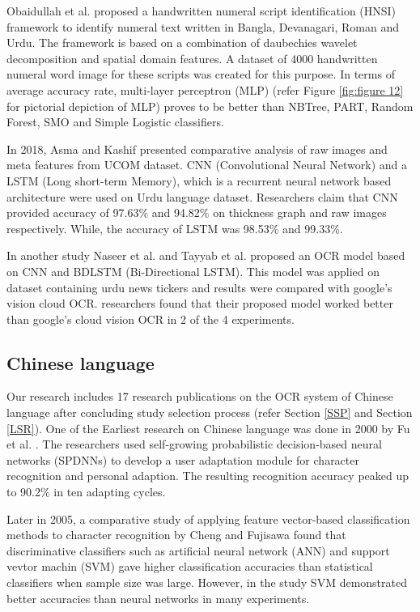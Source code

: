 \documentclass{article}
\begin{document}
Obaidullah et al. \cite{obaidullah2015numeral} proposed a handwritten numeral script identification (HNSI) framework to identify numeral text written in Bangla, Devanagari, Roman and Urdu. The framework is based on a combination of daubechies wavelet decomposition \cite{Daub} and spatial domain features. A dataset of 4000 handwritten numeral word image for these scripts was created for this purpose. In terms of average accuracy rate, multi-layer perceptron (MLP) (refer Figure \ref{fig:figure 12} for pictorial depiction of MLP) proves to be better than NBTree, PART, Random Forest, SMO and Simple Logistic classifiers.

 




In 2018, Asma and Kashif \cite{Asma} presented  comparative analysis of raw images and meta features from UCOM dataset. CNN (Convolutional Neural Network) and a LSTM (Long short-term Memory), which is a recurrent neural network based architecture were used on Urdu language dataset. Researchers claim that CNN provided accuracy of 97.63\% and 94.82\% on thickness graph and raw images respectively. While, the accuracy of LSTM was 98.53\% and 99.33\%. 

In another study Naseer et al. \cite{naseer2018comparative} and Tayyab et al.  \cite{tayyab2018multi} proposed an OCR model based on CNN and BDLSTM (Bi-Directional LSTM). This model was applied on dataset containing urdu news tickers and results were compared with google's vision cloud OCR. researchers found that their proposed model worked better than google's cloud vision OCR in 2 of the 4 experiments.




\subsection{Chinese language}

Our research includes 17 research publications on the OCR system of Chinese language after concluding study selection process (refer Section \ref{SSP} and Section \ref{LSR}).  One of the Earliest research on Chinese language was done in 2000 by Fu et al. \cite{fu2000user}. The researchers used self-growing probabilistic decision-based neural networks (SPDNNs) to develop a user adaptation module for character recognition and personal adaption. The resulting recognition accuracy peaked up to 90.2\% in ten adapting cycles.

Later in 2005, a comparative study of applying feature vector-based classification methods to character recognition by Cheng and Fujisawa \cite{liu2005classification} found that discriminative classifiers such as artificial neural network (ANN) and support vevtor machin (SVM) gave higher classification accuracies than statistical classifiers when sample size was large. However, in the study SVM demonstrated better accuracies than neural networks in many experiments. 
\end{document}
